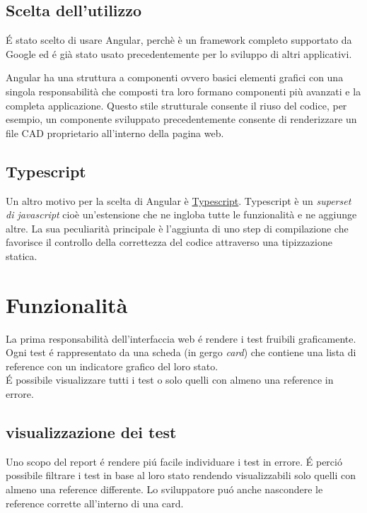         \subsection{Scelta dell'utilizzo}
            \'E stato scelto di usare Angular, perchè è un framework completo supportato da Google
            ed \'e già stato usato precedentemente per lo sviluppo di altri applicativi.
            
            Angular ha una struttura a componenti ovvero basici elementi grafici con una singola responsabilità che composti tra loro formano componenti più avanzati e la completa applicazione.
            Questo stile strutturale consente il riuso del codice, per esempio, un componente sviluppato precedentemente consente
            di renderizzare un file CAD proprietario all'interno della pagina web.
        
        \subsection{Typescript}
            Un altro motivo per la scelta di Angular è \href{https://www.typescriptlang.org}{Typescript}.
            Typescript è un \textit{superset di javascript} cioè un'estensione che ne ingloba tutte le funzionalità e ne aggiunge altre.
            La sua peculiarità principale è l'aggiunta di uno step di compilazione che favorisce il controllo della correttezza del codice attraverso una tipizzazione statica.
    \section{Funzionalità}
        La prima responsabilità dell'interfaccia web \'e rendere i test fruibili graficamente.
        Ogni test \'e rappresentato da una scheda (in gergo \textit{card}) che contiene una lista di reference con un indicatore grafico del loro stato.\\
        \'E possibile visualizzare tutti i test o solo quelli con almeno una reference in errore.\\
        \subsection{visualizzazione dei test}        
            Uno scopo del report \'e rendere pi\'u facile individuare i test in errore.
            \'E perci\'o possibile filtrare i test in base al loro stato rendendo visualizzabili solo quelli con almeno una reference differente.
            Lo sviluppatore pu\'o anche nascondere le reference corrette all'interno di una card.\\

